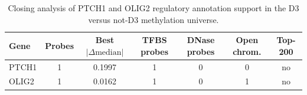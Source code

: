 \begin{table}[htbp]
\centering
\caption{Closing analysis of PTCH1 and OLIG2 regulatory annotation support in the D3 versus not-D3 methylation universe.}
\label{tab:ptch1_olig2_tfbs_closing}
\begin{tabular}{lcccccc}
\hline
Gene & Probes & Best $|\Delta \mathrm{median}|$ & TFBS probes & DNase probes & Open chrom. & Top-200 \\
\hline
PTCH1 & 1 & 0.1997 & 1 & 0 & 0 & no \\
OLIG2 & 1 & 0.0162 & 1 & 0 & 1 & no \\
\hline
\end{tabular}
\end{table}
